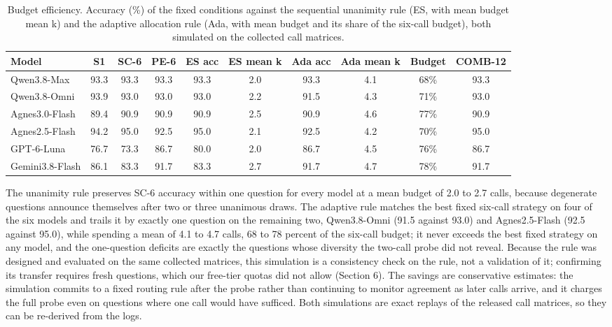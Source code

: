 \documentclass[preprint,12pt]{elsarticle}
\begin{document}
\begin{table}[htbp]
\centering
\footnotesize
\caption{Budget efficiency. Accuracy (\%) of the fixed conditions against the sequential unanimity rule (ES, with mean budget mean k) and the adaptive allocation rule (Ada, with mean budget and its share of the six-call budget), both simulated on the collected call matrices.}

\scriptsize
\begin{tabular}{l c c c c c c c c c}
\toprule
Model & S1 & SC-6 & PE-6 & ES acc & ES mean k & Ada acc & Ada mean k & Budget & COMB-12 \\
\midrule
Qwen3.8-Max & 93.3 & 93.3 & 93.3 & 93.3 & 2.0 & 93.3 & 4.1 & 68\% & 93.3 \\
Qwen3.8-Omni & 93.9 & 93.0 & 93.0 & 93.0 & 2.2 & 91.5 & 4.3 & 71\% & 93.0 \\
Agnes3.0-Flash & 89.4 & 90.9 & 90.9 & 90.9 & 2.5 & 90.9 & 4.6 & 77\% & 90.9 \\
Agnes2.5-Flash & 94.2 & 95.0 & 92.5 & 95.0 & 2.1 & 92.5 & 4.2 & 70\% & 95.0 \\
GPT-6-Luna & 76.7 & 73.3 & 86.7 & 80.0 & 2.0 & 86.7 & 4.5 & 76\% & 86.7 \\
Gemini3.8-Flash & 86.1 & 83.3 & 91.7 & 83.3 & 2.7 & 91.7 & 4.7 & 78\% & 91.7 \\
\bottomrule
\end{tabular}
\end{table}

The unanimity rule preserves SC-6 accuracy within one question for every model at a mean budget of 2.0 to 2.7 calls, because degenerate questions announce themselves after two or three unanimous draws. The adaptive rule matches the best fixed six-call strategy on four of the six models and trails it by exactly one question on the remaining two, Qwen3.8-Omni (91.5 against 93.0) and Agnes2.5-Flash (92.5 against 95.0), while spending a mean of 4.1 to 4.7 calls, 68 to 78 percent of the six-call budget; it never exceeds the best fixed strategy on any model, and the one-question deficits are exactly the questions whose diversity the two-call probe did not reveal. Because the rule was designed and evaluated on the same collected matrices, this simulation is a consistency check on the rule, not a validation of it; confirming its transfer requires fresh questions, which our free-tier quotas did not allow (Section 6). The savings are conservative estimates: the simulation commits to a fixed routing rule after the probe rather than continuing to monitor agreement as later calls arrive, and it charges the full probe even on questions where one call would have sufficed. Both simulations are exact replays of the released call matrices, so they can be re-derived from the logs.
\end{document}
